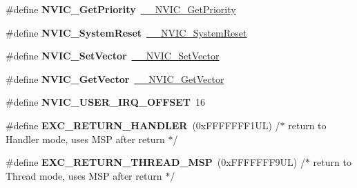 \begin{DoxyCompactItemize}
\#define {\bfseries N\+V\+I\+C\+\_\+\+Get\+Priority}~\hyperlink{group___c_m_s_i_s___core___n_v_i_c_functions_gaeb9dc99c8e7700668813144261b0bc73}{\+\_\+\+\_\+\+N\+V\+I\+C\+\_\+\+Get\+Priority}
\item 
\mbox{\label{group___c_m_s_i_s___core___n_v_i_c_functions_ga6aa0367d3642575610476bf0366f0c48}} 
\#define {\bfseries N\+V\+I\+C\+\_\+\+System\+Reset}~\hyperlink{group___c_m_s_i_s___core___n_v_i_c_functions_ga0d9aa2d30fa54b41eb780c16e35b676c}{\+\_\+\+\_\+\+N\+V\+I\+C\+\_\+\+System\+Reset}
\item 
\mbox{\label{group___c_m_s_i_s___core___n_v_i_c_functions_ga804af63bb4c4c317387897431814775d}} 
\#define {\bfseries N\+V\+I\+C\+\_\+\+Set\+Vector}~\hyperlink{group___c_m_s_i_s___core___n_v_i_c_functions_ga0df355460bc1783d58f9d72ee4884208}{\+\_\+\+\_\+\+N\+V\+I\+C\+\_\+\+Set\+Vector}
\item 
\mbox{\label{group___c_m_s_i_s___core___n_v_i_c_functions_ga955eb1c33a3dcc62af11a8385e8c0fc8}} 
\#define {\bfseries N\+V\+I\+C\+\_\+\+Get\+Vector}~\hyperlink{group___c_m_s_i_s___core___n_v_i_c_functions_ga44b665d2afb708121d9b10c76ff00ee5}{\+\_\+\+\_\+\+N\+V\+I\+C\+\_\+\+Get\+Vector}
\item 
\mbox{\label{group___c_m_s_i_s___core___n_v_i_c_functions_ga8045d905a5ca57437d8e6f71ffcb6df5}} 
\#define {\bfseries N\+V\+I\+C\+\_\+\+U\+S\+E\+R\+\_\+\+I\+R\+Q\+\_\+\+O\+F\+F\+S\+ET}~16
\item 
\mbox{\label{group___c_m_s_i_s___core___n_v_i_c_functions_gaa6fa2b10f756385433e08522d9e4632f}} 
\#define {\bfseries E\+X\+C\+\_\+\+R\+E\+T\+U\+R\+N\+\_\+\+H\+A\+N\+D\+L\+ER}~(0x\+F\+F\+F\+F\+F\+F\+F1\+U\+L)     /$\ast$ return to Handler mode, uses M\+S\+P after return                               $\ast$/
\item 
\mbox{\label{group___c_m_s_i_s___core___n_v_i_c_functions_gaea4703101b5e679f695e231f7ee72331}} 
\#define {\bfseries E\+X\+C\+\_\+\+R\+E\+T\+U\+R\+N\+\_\+\+T\+H\+R\+E\+A\+D\+\_\+\+M\+SP}~(0x\+F\+F\+F\+F\+F\+F\+F9\+U\+L)     /$\ast$ return to Thread mode, uses M\+S\+P after return                                $\ast$/

\end{DoxyCompactItemize}
